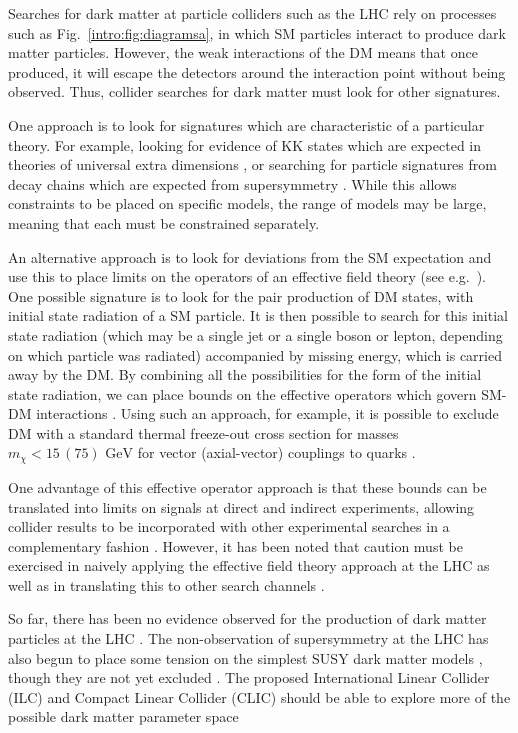 Searches for dark matter at particle colliders such as the LHC rely on processes such as Fig.~\ref{intro:fig:diagramsa}, in which SM particles interact to produce dark matter particles. However, the weak interactions of the DM means that once produced, it will escape the detectors around the interaction point without being observed. Thus, collider searches for dark matter must look for other signatures.

One approach is to look for signatures which are characteristic of a particular theory. For example, looking for evidence of KK states which are expected in theories of universal extra dimensions \cite{Edelhauser:2013, Kakuda:2013}, or searching for particle signatures from decay chains which are expected from supersymmetry \cite{ATLAS:2013, CMS:2013}. While this allows constraints to be placed on specific models, the range of models may be large, meaning that each must be constrained separately.


An alternative approach is to look for deviations from the SM expectation and use this to place limits on the operators of an effective field theory (see e.g.~\cite{Zhang:2011}). One possible signature is to look for the pair production of DM states, with initial state radiation of a SM particle. It is then possible to search for this initial state radiation (which may be a single jet or a single boson or lepton, depending on which particle was radiated) accompanied by missing energy, which is carried away by the DM. By combining all the possibilities for the form of the initial state radiation, we can place bounds on the effective operators which govern SM-DM interactions \cite{Zhou:2013}. Using such an approach, for example, it is possible to exclude DM with a standard thermal freeze-out cross section for masses $m_\chi < 15 \,(75) \textrm{ GeV}$ for vector (axial-vector) couplings to quarks \cite{Fox:2011a}.

One advantage of this effective operator approach is that these bounds can be translated into limits on signals at direct and indirect experiments, allowing collider results to be incorporated with other experimental searches in a complementary fashion \cite{Baer:2009}. However, it has been noted that caution must be exercised in naively applying the effective field theory approach at the LHC as well as in translating this to other search channels \cite{Buchmueller:2013,Busoni:2013}.

So far, there has been no evidence observed for the production of dark matter particles at the LHC \cite{Malik:2012}. The non-observation of supersymmetry at the LHC has also begun to place some tension on the simplest SUSY dark matter models \cite{Bechtle:2012}, though they are not yet excluded \cite{Bechtle:2013}. The proposed International Linear Collider (ILC) \cite{Barish:2013} and Compact Linear Collider (CLIC) \cite{Lebrun:2012} should be able to explore more of the possible dark matter parameter space \cite{Schmeier:2013,Chae:2013}


